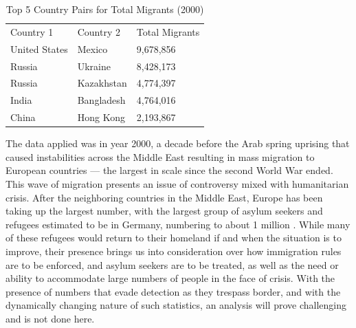 \documentclass{acm_proc_article-sp}
\begin{document}
\begin{table}[h]
\centering
\caption{Top 5 Country Pairs for Total Migrants (2000)}
\begin{tabular}{|l|l|l|}
\cline{1-3}
Country 1     & Country 2  & Total Migrants \\ \cline{1-3}
United States & Mexico     & 9,678,856      \\ \cline{1-3}
Russia        & Ukraine    & 8,428,173      \\ \cline{1-3}
Russia        & Kazakhstan & 4,774,397      \\ \cline{1-3}
India         & Bangladesh & 4,764,016      \\ \cline{1-3}
China         & Hong Kong  & 2,193,867      \\ \cline{1-3}
\end{tabular}
\label{tab:total}
\end{table}

The data applied was in year 2000, a decade before the Arab spring uprising that caused instabilities across the Middle East resulting in mass migration to European countries --- the largest in scale since the second World War ended. This wave of migration presents an issue of controversy mixed with humanitarian crisis. After the neighboring countries in the Middle East, Europe has been taking up the largest number, with the largest group of asylum seekers and refugees estimated to be in Germany, numbering to about 1 million \cite{million}. While many of these refugees would return to their homeland if and when the situation is to improve, their presence brings us into consideration over how immigration rules are to be enforced, and asylum seekers are to be treated, as well as the need or ability to accommodate large numbers of people in the face of crisis. With the presence of numbers that evade detection as they trespass border, and with the dynamically changing nature of such statistics, an analysis will prove challenging and is not done here.
\end{document}
